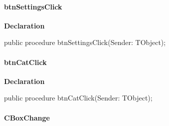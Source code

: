\documentclass{report}
\newif\ifpdf
\begin{document}
\paragraph*{btnSettingsClick}\hspace*{\fill}

\label{manager.TmnFrm-btnSettingsClick}
\begin{list}{}{
\setlength{\itemindent}{0cm}
\setlength{\listparindent}{0cm}
\setlength{\leftmargin}{\evensidemargin}
\addtolength{\leftmargin}{\tmplength}
\settowidth{\labelsep}{X}
\addtolength{\leftmargin}{\labelsep}
\setlength{\labelwidth}{\tmplength}
}
\item[\textbf{Declaration}\hfill]
\ifpdf
\begin{flushleft}
\fi
\begin{ttfamily}
public procedure btnSettingsClick(Sender: TObject);\end{ttfamily}

\ifpdf
\end{flushleft}
\fi

\end{list}
\paragraph*{btnCatClick}\hspace*{\fill}

\label{manager.TmnFrm-btnCatClick}
\begin{list}{}{
\setlength{\itemindent}{0cm}
\setlength{\listparindent}{0cm}
\setlength{\leftmargin}{\evensidemargin}
\addtolength{\leftmargin}{\tmplength}
\settowidth{\labelsep}{X}
\addtolength{\leftmargin}{\labelsep}
\setlength{\labelwidth}{\tmplength}
}
\item[\textbf{Declaration}\hfill]
\ifpdf
\begin{flushleft}
\fi
\begin{ttfamily}
public procedure btnCatClick(Sender: TObject);\end{ttfamily}

\ifpdf
\end{flushleft}
\fi

\end{list}
\paragraph*{CBoxChange}\hspace*{\fill}
\end{document}
